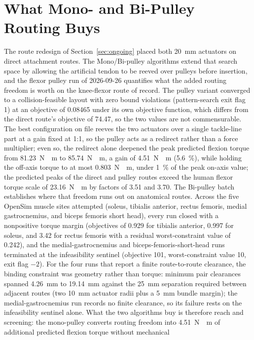 \section{What Mono- and Bi-Pulley Routing Buys}\label{sec:disc_pulley}

The route redesign of Section~\ref{sec:ongoing} placed both \qty{20}{\mm} actuators on direct attachment routes. The Mono/Bi-pulley algorithms extend that search space by allowing the artificial tendon to be reeved over pulleys before insertion, and the flexor pulley run of 2026-09-26 quantifies what the added routing freedom is worth on the knee-flexor route of record. The pulley variant converged to a collision-feasible layout with zero bound violations (pattern-search exit flag 1) at an objective of 0.08465 under its own objective function, which differs from the direct route's objective of 74.47, so the two values are not commensurable. The best configuration on file reeves the two actuators over a single tackle-line part at a gain fixed at 1:1, so the pulley acts as a redirect rather than a force multiplier; even so, the redirect alone deepened the peak predicted flexion torque from \qty{81.23}{\newton\cdot\meter} to \qty{85.74}{\newton\cdot\meter}, a gain of \qty{4.51}{\newton\cdot\meter} (\qty{5.6}{\percent}), while holding the off-axis torque to at most \qty{0.803}{\newton\cdot\meter}, under \qty{1}{\percent} of the peak on-axis value; the predicted peaks of the direct and pulley routes exceed the human flexor torque scale of \qty{23.16}{\newton\cdot\meter} by factors of 3.51 and 3.70. The Bi-pulley batch establishes where that freedom runs out on anatomical routes. Across the five OpenSim muscle sites attempted (soleus, tibialis anterior, rectus femoris, medial gastrocnemius, and biceps femoris short head), every run closed with a nonpositive torque margin (objectives of 0.929 for tibialis anterior, 0.997 for soleus, and 3.42 for rectus femoris with a residual worst-constraint value of 0.242), and the medial-gastrocnemius and biceps-femoris-short-head runs terminated at the infeasibility sentinel (objective 101, worst-constraint value 10, exit flag $-2$). For the four runs that report a finite route-to-route clearance, the binding constraint was geometry rather than torque: minimum pair clearances spanned \qty{4.26}{\mm} to \qty{19.14}{\mm} against the \qty{25}{\mm} separation required between adjacent routes (two \qty{10}{\mm} actuator radii plus a \qty{5}{\mm} bundle margin); the medial-gastrocnemius run records no finite clearance, so its failure rests on the infeasibility sentinel alone. What the two algorithms buy is therefore reach and screening: the mono-pulley converts routing freedom into \qty{4.51}{\newton\cdot\meter} of additional predicted flexion torque without mechanical 